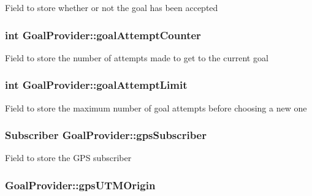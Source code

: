 \-Field to store whether or not the goal has been accepted \hypertarget{classGoalProvider_a35c75c0ef169d26dc40393e988f6f9ef}{
\subsubsection[{goal\-Attempt\-Counter}]{\setlength{\rightskip}{0pt plus 5cm}int {\bf \-Goal\-Provider\-::goal\-Attempt\-Counter}}}\label{classGoalProvider_a35c75c0ef169d26dc40393e988f6f9ef}
\-Field to store the number of attempts made to get to the current goal \hypertarget{classGoalProvider_ab63657ef75bd9c478d01b270a142103e}{
\subsubsection[{goal\-Attempt\-Limit}]{\setlength{\rightskip}{0pt plus 5cm}int {\bf \-Goal\-Provider\-::goal\-Attempt\-Limit}}}\label{classGoalProvider_ab63657ef75bd9c478d01b270a142103e}
\-Field to store the maximum number of goal attempts before choosing a new one \hypertarget{classGoalProvider_a25af65ca4565bee69daba5c9b2c11b8f}{
\subsubsection[{gps\-Subscriber}]{\setlength{\rightskip}{0pt plus 5cm}\-Subscriber {\bf \-Goal\-Provider\-::gps\-Subscriber}}}\label{classGoalProvider_a25af65ca4565bee69daba5c9b2c11b8f}
\-Field to store the \-G\-P\-S subscriber \hypertarget{classGoalProvider_a274c71aaace4fb19551ecfd58356744a}{
\subsubsection[{gps\-U\-T\-M\-Origin}]{ {\bf \-Goal\-Provider\-::gps\-U\-T\-M\-Origin}}}\label{classGoalProvider_a274c71aaace4fb19551ecfd58356744a}
